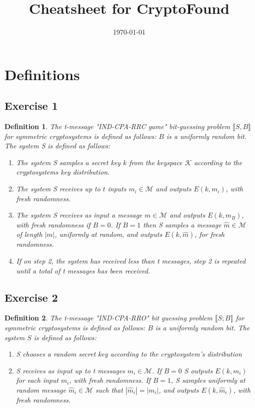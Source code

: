 \documentclass[a4paper,german]{article}
\title{Cheatsheet for CryptoFound}
\date{\today}
\newtheorem{definition}{Definition}
\begin{document}
\maketitle

\section*{Definitions}
\subsection*{Exercise 1}
\begin{definition}
	The \emph{t-message} "IND-CPA-RRC game" bit-guessing problem $\llbracket S, B\rrbracket$ for symmetric cryptosystems is defined as follows: $B$ is a uniformly random bit. The system S is defined as follows:

	\begin{enumerate}

		\item  The system S samples a secret key $k$ from the keyspace $\mathcal{K}$ according to the cryptosystems key distribution.
		\item  The system S receives up to $t$ inputs $m_i \in \mathcal{M}$ and outputs $E(k, m_i)$, with fresh randomness.
		\item  The system S receives as input a message $m \in \mathcal{M}$ and outputs  $E(k, m_B)$, with fresh randomness if $B = 0$. If $B=1$ then S samples a message $\hat{m} \in \mathcal{M}$ of length $|m|$, uniformly at random, and outputs $E(k, \hat{m})$, for fresh randomness.
		 \item If on step 2, the system has received less than t messages, step 2 is repeated until a total of t messages has been received.

	\end{enumerate}
\end{definition}
\subsection*{Exercise 2}

\begin{definition}
	The t-message "IND-CPA-RRO" bit guessing problem $\llbracket S; B \rrbracket$ for symmetric cryptosystems is defined as follows: $B$ is a uniformly random bit. The system $S$ is defined as follows:

	\begin{enumerate}

		\item  S chooses a random secret key according to the cryptosystem's distribution
		\item  S receives as input up to t messages $m_i \in \mathcal{M}$. If $B=0$ S outputs $E(k, m_i)$ for each input $m_i$, with fresh randomness. If $B=1$, S samples uniformly at random message $\hat{m}_i \in \mathcal{M}$ such that $|\hat{m}_i| = |m_i|$, and outputs $E(k, \hat{m}_i)$, with fresh randomness.

	\end{enumerate}
\end{definition}
\end{document}
